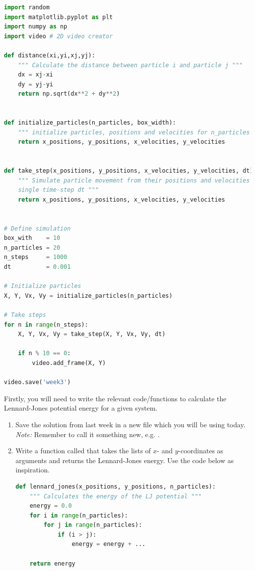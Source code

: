 \documentclass{article}
\begin{document}
\begin{lstlisting}[language=python]
import random
import matplotlib.pyplot as plt
import numpy as np
import video # 2D video creator

def distance(xi,yi,xj,yj):
    """ Calculate the distance between particle i and particle j """
    dx = xj-xi
    dy = yj-yi
    return np.sqrt(dx**2 + dy**2)


def initialize_particles(n_particles, box_width):
    """ initialize particles, positions and velocities for n_particles """
    return x_positions, y_positions, x_velocities, y_velocities


def take_step(x_positions, y_positions, x_velocities, y_velocities, dt):
    """ Simulate particle movement from their positions and velocities in a
    single time-step dt """
    return x_positions, y_positions, x_velocities, y_velocities


# Define simulation
box_with    = 10
n_particles = 20
n_steps     = 1000
dt          = 0.001

# Initialize particles
X, Y, Vx, Vy = initialize_particles(n_particles)

# Take steps
for n in range(n_steps):
    X, Y, Vx, Vy = take_step(X, Y, Vx, Vy, dt)

    if n % 10 == 0:
        video.add_frame(X, Y)

video.save('week3')

\end{lstlisting}

\newpage
\clearpage


Firstly, you will need to write the relevant code/functions to calculate the
Lennard-Jones potential energy for a given system.

\begin{enumerate}
    \item Save the solution from last week in a new file which you will be using today.
        {\em Note:} Remember to call it something new, e.g. .


    \item Write a function called  that takes the lists of $x$- and $y$-coordinates as arguments and returns the Lennard-Jones energy. Use the code below as inspiration.
\begin{lstlisting}[language=python]
def lennard_jones(x_positions, y_positions, n_particles):
    """ Calculates the energy of the LJ potential """
    energy = 0.0
    for i in range(n_particles):
        for j in range(n_particles):
            if (i > j):
                energy = energy + ...

    return energy
\end{lstlisting}

\end{enumerate}
\end{document}

